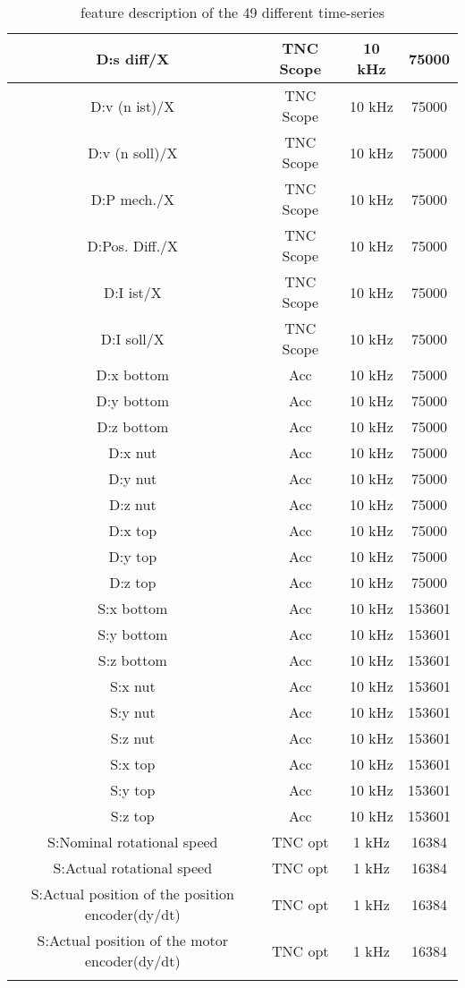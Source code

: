 \begin{center}
\begin{longtable}{||c c c c||}
 D:s diff/X & TNC Scope & 10 kHz & 75000 \\ 
 \hline
 D:v (n ist)/X & TNC Scope & 10 kHz & 75000 \\ 
 \hline
 D:v (n soll)/X & TNC Scope & 10 kHz & 75000 \\ 
 \hline
 D:P mech./X & TNC Scope & 10 kHz & 75000 \\ 
 \hline
 D:Pos. Diff./X & TNC Scope & 10 kHz & 75000 \\ 
  \hline
 D:I ist/X & TNC Scope & 10 kHz & 75000 \\ 
 \hline
 D:I soll/X & TNC Scope & 10 kHz & 75000 \\ 
 \hline
 D:x bottom & Acc & 10 kHz & 75000 \\ 
  \hline
 D:y bottom & Acc & 10 kHz & 75000 \\ 
 \hline
 D:z bottom & Acc & 10 kHz & 75000 \\ 
 \hline
 D:x nut & Acc & 10 kHz & 75000 \\ 
 \hline
 D:y nut & Acc & 10 kHz & 75000 \\ 
 \hline
 D:z nut & Acc & 10 kHz & 75000 \\ 
 \hline
 D:x top & Acc & 10 kHz & 75000 \\
  \hline
 D:y top & Acc & 10 kHz & 75000 \\ 
 \hline
 D:z top & Acc & 10 kHz & 75000 \\ 
 \hline
 S:x bottom & Acc & 10 kHz & 153601 \\ 
 \hline
 S:y bottom & Acc & 10 kHz & 153601 \\ 
 \hline
 S:z bottom & Acc & 10 kHz & 153601 \\ 
 \hline
 S:x nut & Acc & 10 kHz & 153601 \\ 
  \hline
 S:y nut & Acc & 10 kHz & 153601 \\ 
 \hline
 S:z nut & Acc & 10 kHz & 153601 \\ 
 \hline
 S:x top & Acc & 10 kHz & 153601 \\ 
 \hline
 S:y top & Acc & 10 kHz & 153601 \\ 
 \hline
 S:z top & Acc & 10 kHz & 153601 \\ 
 \hline
 S:Nominal rotational speed & TNC opt & 1 kHz & 16384 \\
  \hline
 S:Actual rotational speed & TNC opt & 1 kHz & 16384 \\ 
 \hline
 S:Actual position of the position encoder(dy/dt) & TNC opt & 1 kHz & 16384 \\ 
 \hline
 S:Actual position of the motor encoder(dy/dt)  & TNC opt & 1 kHz & 16384  \\ [1ex] 
 \hline
\caption {feature description of the 49 different time-series}
\label {tab:description_of_the_49_recorded_features}
\end{longtable}
\end{center}

